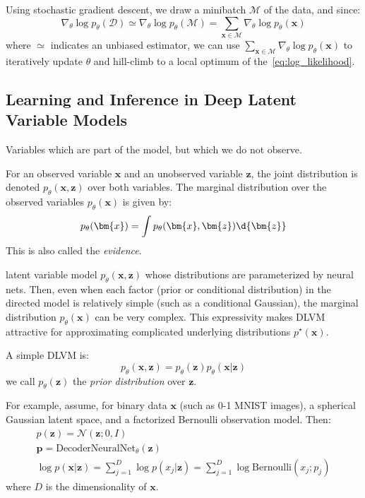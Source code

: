 \documentclass{article}
\begin{document}
Using stochastic gradient descent, we draw a minibatch $\mathcal{M}$ of the data, and since:
\[
  \nabla_{\theta} \log  p_{\theta}(\mathcal{D})  \simeq \nabla_{\theta} \log  p_{\theta} (\mathcal{M})  = \sum_{\bm{x} \in \mathcal{M}} \nabla_{\theta}  \log  p_{\theta}(\bm{x})
\]
where $\simeq$ indicates an unbiased estimator, we can use $\displaystyle \sum_{\bm{x} \in \mathcal{M}} \nabla_{\theta} \log  p_{\theta}(\bm{x})$ to iteratively update $\theta$ and  hill-climb to a local optimum of the~\ref{eq:log_likelihood}.  

\subsection{Learning and Inference in Deep Latent Variable Models}
\begin{definition}  Variables which are part of the model, but which we do not observe.

For an observed variable $\bm{x}$ and an unobserved variable $\bm{z}$, the joint distribution is denoted $p_{\theta}(\bm{x}, \bm{z})$ over both variables. The marginal distribution over the observed variables $p_{\theta}(\bm{x})$ is given by:
  \begin{equation} \label{eq:marginalLikelihood}
  p_{\theta}(\bm{x}) = \int p_{\theta}(\bm{x}, \bm{z}) \d{\bm{z}}
\end{equation}
This is also called the \textit{evidence}.
\end{definition}

\begin{definition}  latent variable model $p_{\theta}(\bm{x}, \bm{z})$ whose distributions are parameterized by neural nets. Then, even when each factor (prior or conditional distribution) in the directed model is relatively simple (such as a conditional Gaussian), the marginal distribution $p_{\theta}(\bm{x})$ can be very complex. This expressivity makes DLVM attractive for approximating complicated underlying distributions $p ^{\star}(\bm{x})$. 
\end{definition}

\begin{example}  A simple DLVM is:
\[
  p_{\theta}(\bm{x}, \bm{z}) = p_{\theta}(\bm{z}) p_{\theta}(\bm{x} | \bm{z}) 
\]
we call $p_{\theta}(\bm{z})$ the \textit{prior distribution} over $\bm{z}$. 

  For example, assume, for binary data $\bm{x}$ (such as 0-1 MNIST images), a spherical Gaussian latent space, and a factorized Bernoulli observation model. Then:
\begin{gather*}
  p (\bm{z}) = \mathcal{N}( \bm{z} ; 0, I) \\
  \bm{p} = \mathrm{DecoderNeuralNet}_{\theta} (\bm{z}) \\
  \log p( \bm{x} | \bm{z}) = \sum_{j=1}^{D} \log  p (x_j | \bm{z}) = \sum_{j=1}^{D} \log \mathrm{Bernoulli}( x_{j} ; p_{j} )
\end{gather*}
where $D$ is the dimensionality of $\bm{x}$. 
\end{example}
\end{document}
